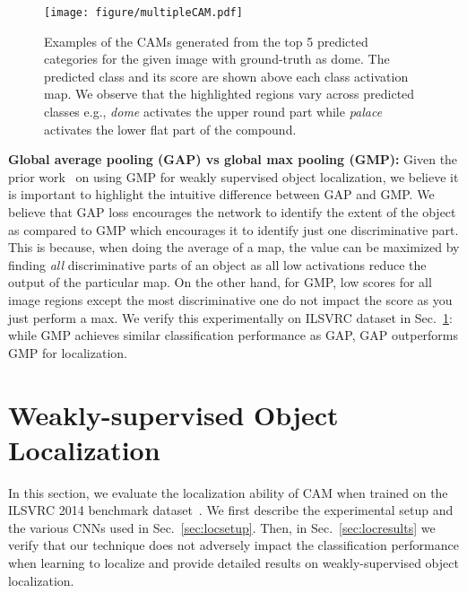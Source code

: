\documentclass[10pt,twocolumn,letterpaper]{article}
\begin{document}
\begin{figure}
\begin{center}
\texttt{[image: figure/multipleCAM.pdf]}
\end{center}
\vspace*{-4mm}
 \caption{Examples of the CAMs generated from the top 5 predicted categories for the given image with ground-truth as dome. The predicted class and its score are shown above each class activation map. We observe that the highlighted regions vary across predicted classes e.g., \textit{dome} activates the upper round part while \textit{palace} activates the lower flat part of the compound.}\label{figure_multipleprediction}
\end{figure}



























\textbf{Global average pooling (GAP) vs global max pooling (GMP):} Given the prior work~\cite{oquab2014weakly} on using GMP for weakly supervised object localization, we believe it is important to highlight the intuitive difference between GAP and GMP. We believe that GAP loss encourages the network to identify the extent of the object as compared to GMP which encourages it to identify just one discriminative part. This is because, when doing the average of a map, the value can be maximized by finding \textit{all} discriminative parts of an object as all low activations reduce the output of the particular map. On the other hand, for GMP, low scores for all image regions except the most discriminative one do not impact the score as you just perform a max. We verify this experimentally on ILSVRC dataset in Sec.~\ref{sec:weaklocalization}: while GMP achieves similar classification performance as GAP, GAP outperforms GMP for localization.

\section{Weakly-supervised Object Localization}
\label{sec:weaklocalization}
In this section, we evaluate the localization ability of CAM when trained on the ILSVRC 2014 benchmark dataset~\cite{ILSVRCijcv15}. We first describe the experimental setup and the various CNNs used in Sec.~\ref{sec:locsetup}. Then, in Sec.~\ref{sec:locresults} we verify that our technique does not adversely impact the classification performance when learning to localize and provide detailed results on weakly-supervised object localization.
\end{document}
